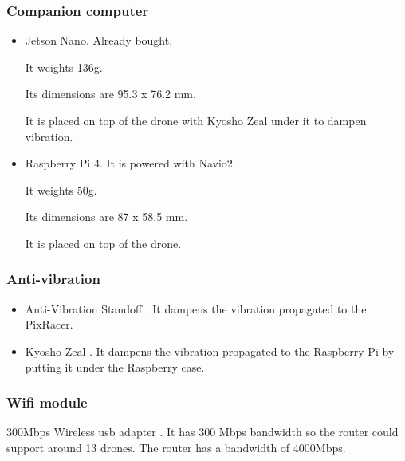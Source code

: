             \subsubsection{Companion computer}
                \begin{itemize}
                    \item Jetson Nano. Already bought.
                
                    It weights 136g.
                    
                    Its dimensions are 95.3 x 76.2 mm.
                    
                    It is placed on top of the drone with Kyosho Zeal under it to dampen vibration.
                
                    \item Raspberry Pi 4. It is powered with Navio2.
                
                    It weights 50g.
                    
                    Its dimensions are 87 x 58.5 mm.
                    
                    It is placed on top of the drone.
                \end{itemize}
                
            \subsubsection{Anti-vibration}
                \begin{itemize}
                    \item Anti-Vibration Standoff \cite{bangood_standoff}. It dampens the vibration propagated to the PixRacer.
                    
                    \item Kyosho Zeal \cite{amazon_kyosho}. It dampens the vibration propagated to the Raspberry Pi by putting it under the Raspberry case.
                \end{itemize}
                
            \subsubsection{Wifi module}
                300Mbps Wireless usb adapter \cite{amazon_panda_wifi_module}. It has 300 Mbps bandwidth so the router could support around 13 drones. The router has a bandwidth of 4000Mbps.
                

